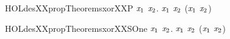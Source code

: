 \begin{SaveVerbatim}{HOLdesXXpropTheoremsxorXXP}
\HOLTokenTurnstile{} \HOLSymConst{\HOLTokenForall{}}\ensuremath{\HOLBoundVar{x}\sb{\mathrm{1}}} \ensuremath{\HOLBoundVar{x}\sb{\mathrm{2}}}.  \ensuremath{\HOLBoundVar{x}\sb{\mathrm{1}}} \HOLSymConst{\HOLTokenEor{}}  \ensuremath{\HOLBoundVar{x}\sb{\mathrm{2}}} \HOLSymConst{=}  (\ensuremath{\HOLBoundVar{x}\sb{\mathrm{1}}} \HOLSymConst{\HOLTokenEor{}} \ensuremath{\HOLBoundVar{x}\sb{\mathrm{2}}})
\end{SaveVerbatim}
\newcommand{\HOLdesXXpropTheoremsxorXXP}{\UseVerbatim{HOLdesXXpropTheoremsxorXXP}}
\begin{SaveVerbatim}{HOLdesXXpropTheoremsxorXXSOne}
\HOLTokenTurnstile{} \HOLSymConst{\HOLTokenExists{}}\ensuremath{\HOLBoundVar{x}\sb{\mathrm{1}}} \ensuremath{\HOLBoundVar{x}\sb{\mathrm{2}}}.  \ensuremath{\HOLBoundVar{x}\sb{\mathrm{1}}} \HOLSymConst{\HOLTokenEor{}}  \ensuremath{\HOLBoundVar{x}\sb{\mathrm{2}}} \HOLSymConst{\HOLTokenNotEqual{}}  (\ensuremath{\HOLBoundVar{x}\sb{\mathrm{1}}} \HOLSymConst{\HOLTokenEor{}} \ensuremath{\HOLBoundVar{x}\sb{\mathrm{2}}})
\end{SaveVerbatim}
\newcommand{\HOLdesXXpropTheoremsxorXXSOne}{\UseVerbatim{HOLdesXXpropTheoremsxorXXSOne}}
